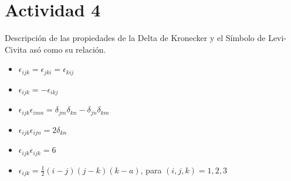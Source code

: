 \documentclass{article}
\begin{document}
\section{Actividad 4}
Descripción de las propiedades de la Delta de Kronecker y el Símbolo de Levi-Civita asó como su relación.
\begin{itemize}
    \item $\epsilon_{ijk}=\epsilon_{jki}=\epsilon_{kij}$
    \item $\epsilon_{ijk}=-\epsilon_{ikj}$
    \item $\epsilon_{ijk}\epsilon_{imn}=\delta_{jm}\delta_{kn}-\delta_{jn}\delta_{km}$
    \item $\epsilon_{ijk}\epsilon_{ijn}=2\delta_{kn}$
    \item $\epsilon_{ijk}\epsilon_{ijk}=6$
    \item $\epsilon_{ijk}=\frac{1}{2}(i-j)(j-k)(k-a)$, para $(i,j,k)=1,2,3$
\end{itemize}
\newpage
\end{document}
